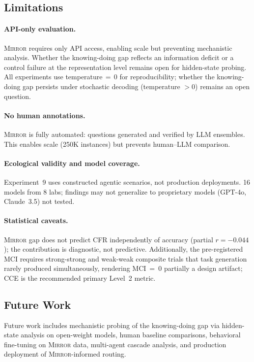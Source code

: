 \documentclass[10pt]{article}
\newcommand{\mirror}{\textsc{Mirror}}
\newcommand{\MCI}{MCI}
\newcommand{\CCE}{CCE}
\newcommand{\CFR}{CFR}
\begin{document}
\subsection{Limitations}

\paragraph{API-only evaluation.}
\mirror{} requires only API access, enabling scale but preventing mechanistic
analysis. Whether the knowing-doing gap reflects an information deficit or a
control failure at the representation level remains open for hidden-state probing.
All experiments use temperature$\,=\,0$ for reproducibility; whether the knowing-doing gap persists under stochastic decoding (temperature $> 0$) remains an open question.

\paragraph{No human annotations.}
\mirror{} is fully automated: questions generated and verified by LLM ensembles.
This enables scale (250K instances) but prevents human--LLM comparison.

\paragraph{Ecological validity and model coverage.}
Experiment~9 uses constructed agentic scenarios, not production deployments. 16 models from 8 labs; findings may not generalize to proprietary models (GPT-4o, Claude~3.5) not tested.

\paragraph{Statistical caveats.}
\mirror{} gap does not predict \CFR{} independently of accuracy (partial $r = -0.044$); the contribution is diagnostic, not predictive. Additionally, the pre-registered \MCI{} requires strong-strong and weak-weak composite trials that task generation rarely produced simultaneously, rendering \MCI{}~=~0 partially a design artifact; \CCE{} is the recommended primary Level~2 metric.

\subsection{Future Work}

Future work includes mechanistic probing of the knowing-doing gap via hidden-state analysis on open-weight models, human baseline comparisons, behavioral fine-tuning on \mirror{} data, multi-agent cascade analysis, and production deployment of \mirror{}-informed routing.
\end{document}
